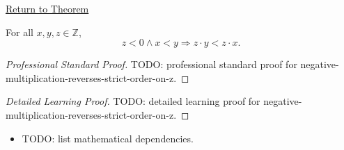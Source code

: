 \newpage
{}
\label{prf:negative-multiplication-reverses-strict-order-on-z}

\begin{remark*}[Return]
\hyperref[thm:negative-multiplication-reverses-strict-order-on-z]{Return to Theorem}
\end{remark*}

\begin{theorem*}
For all $x,y,z\in\mathbb{Z}$,
\[
z<0\land x<y \Longrightarrow z\cdot y<z\cdot x.
\]
\end{theorem*}

\begin{proof}[Professional Standard Proof]
\LRAProofBodyStart
TODO: professional standard proof for negative-multiplication-reverses-strict-order-on-z.
\end{proof}

\begin{proof}[Detailed Learning Proof]
\LRAProofBodyStart
TODO: detailed learning proof for negative-multiplication-reverses-strict-order-on-z.
\end{proof}

\begin{remark*}
\end{remark*}

\begin{dependencies}
\begin{itemize}
  \item TODO: list mathematical dependencies.
\end{itemize}
\end{dependencies}

\clearpage
